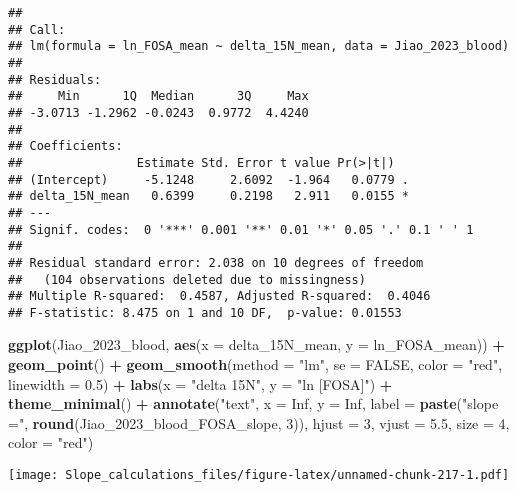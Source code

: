 \documentclass[
]{article}
\newenvironment{Shaded}{\begin{snugshade}}{\end{snugshade}}
\newcommand{\AttributeTok}[1]{\textcolor[rgb]{0.13,0.29,0.53}{#1}}
\newcommand{\ConstantTok}[1]{\textcolor[rgb]{0.56,0.35,0.01}{#1}}
\newcommand{\DecValTok}[1]{\textcolor[rgb]{0.00,0.00,0.81}{#1}}
\newcommand{\FloatTok}[1]{\textcolor[rgb]{0.00,0.00,0.81}{#1}}
\newcommand{\FunctionTok}[1]{\textcolor[rgb]{0.13,0.29,0.53}{\textbf{#1}}}
\newcommand{\NormalTok}[1]{#1}
\newcommand{\SpecialCharTok}[1]{\textcolor[rgb]{0.81,0.36,0.00}{\textbf{#1}}}
\newcommand{\StringTok}[1]{\textcolor[rgb]{0.31,0.60,0.02}{#1}}
\begin{document}
\begin{verbatim}
## 
## Call:
## lm(formula = ln_FOSA_mean ~ delta_15N_mean, data = Jiao_2023_blood)
## 
## Residuals:
##     Min      1Q  Median      3Q     Max 
## -3.0713 -1.2962 -0.0243  0.9772  4.4240 
## 
## Coefficients:
##                Estimate Std. Error t value Pr(>|t|)  
## (Intercept)     -5.1248     2.6092  -1.964   0.0779 .
## delta_15N_mean   0.6399     0.2198   2.911   0.0155 *
## ---
## Signif. codes:  0 '***' 0.001 '**' 0.01 '*' 0.05 '.' 0.1 ' ' 1
## 
## Residual standard error: 2.038 on 10 degrees of freedom
##   (104 observations deleted due to missingness)
## Multiple R-squared:  0.4587, Adjusted R-squared:  0.4046 
## F-statistic: 8.475 on 1 and 10 DF,  p-value: 0.01553
\end{verbatim}

\begin{Shaded}
\begin{Highlighting}[]
\FunctionTok{ggplot}\NormalTok{(Jiao\_2023\_blood, }\FunctionTok{aes}\NormalTok{(}\AttributeTok{x =}\NormalTok{ delta\_15N\_mean, }\AttributeTok{y =}\NormalTok{ ln\_FOSA\_mean)) }\SpecialCharTok{+}
  \FunctionTok{geom\_point}\NormalTok{() }\SpecialCharTok{+}
  \FunctionTok{geom\_smooth}\NormalTok{(}\AttributeTok{method =} \StringTok{"lm"}\NormalTok{, }\AttributeTok{se =} \ConstantTok{FALSE}\NormalTok{, }\AttributeTok{color =} \StringTok{"red"}\NormalTok{, }\AttributeTok{linewidth =} \FloatTok{0.5}\NormalTok{) }\SpecialCharTok{+}
  \FunctionTok{labs}\NormalTok{(}\AttributeTok{x =} \StringTok{"delta 15N"}\NormalTok{,}
       \AttributeTok{y =} \StringTok{"ln [FOSA]"}\NormalTok{) }\SpecialCharTok{+}
  \FunctionTok{theme\_minimal}\NormalTok{() }\SpecialCharTok{+}
  \FunctionTok{annotate}\NormalTok{(}\StringTok{"text"}\NormalTok{, }\AttributeTok{x =} \ConstantTok{Inf}\NormalTok{, }\AttributeTok{y =} \ConstantTok{Inf}\NormalTok{, }\AttributeTok{label =} \FunctionTok{paste}\NormalTok{(}\StringTok{"slope ="}\NormalTok{, }\FunctionTok{round}\NormalTok{(Jiao\_2023\_blood\_FOSA\_slope, }\DecValTok{3}\NormalTok{)), }
           \AttributeTok{hjust =} \DecValTok{3}\NormalTok{, }\AttributeTok{vjust =} \FloatTok{5.5}\NormalTok{, }\AttributeTok{size =} \DecValTok{4}\NormalTok{, }\AttributeTok{color =} \StringTok{"red"}\NormalTok{)}
\end{Highlighting}
\end{Shaded}

\texttt{[image: Slope\_calculations\_files/figure-latex/unnamed-chunk-217-1.pdf]}
\end{document}
